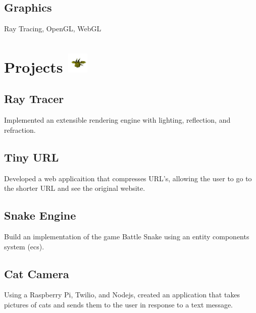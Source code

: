 \documentclass{article}
\newcommand{\hrefColored}[3]{\href{#2}{\color{#1}{#3}}}
\begin{document}
\subsection{Graphics}

Ray Tracing, OpenGL, WebGL

\section{Projects \protect\includegraphics[height=1cm]{Frank.png}}

\subsection{Ray Tracer \hrefColored{blue}{https://github.com/McRaeAlex/tiny-raytracer}{github.com/McRaeAlex/tiny-raytracer}}

Implemented an extensible rendering engine with lighting, reflection, and 
refraction.

\subsection{Tiny URL \hrefColored{blue}{https://github.com/McRaeAlex/tinyURL}{github.com/McRaeAlex/tinyURL}}

Developed a web applicaition that compresses URL's, allowing the user to go to 
the shorter URL and see the original website.

\subsection{Snake Engine \hrefColored{blue}{https://github.com/McRaeAlex/dimensional-snake-engine}{github.com/McRaeAlex/dimensional-snake-engine}}

Build an implementation of the game Battle Snake using an entity components
system (ecs).

\subsection{Cat Camera \hrefColored{blue}{https://github.com/McRaeAlex/prettykitty}{github.com/McRaeAlex/prettykitty}}

Using a Raspberry Pi, Twilio, and Nodejs, created an application that takes 
pictures of cats and sends them to the user in response to a text message.
\end{document}
